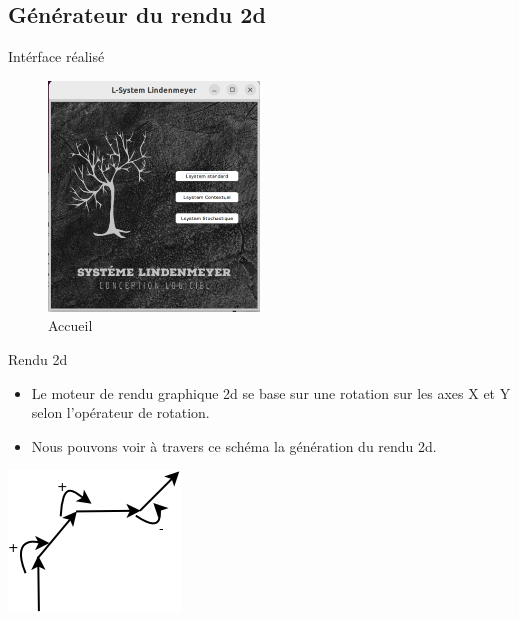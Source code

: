     

     



\subsection{Générateur du rendu 2d}
    \begin{frame}{Intérface réalisé}
     \begin{figure}[h!]
      \centering
      \includegraphics[width=0.5\textwidth]{images/rendu3D.png}
      \caption{Accueil}
      \label{fig:3D}
    \end{figure}
\end{frame}
\begin{frame}{Rendu 2d}
    \begin{itemize}
        \item Le moteur de rendu graphique 2d se base sur une rotation sur les axes X et Y selon l'opérateur de rotation. 
        \vspace{0.2cm}
        \item Nous pouvons voir à travers ce schéma la génération du rendu 2d. 
    \end{itemize}
    \vspace{1cm}
    \begin{center}
        \includegraphics[scale=0.5]{./images/schema.png}
    \end{center}
\end{frame}

